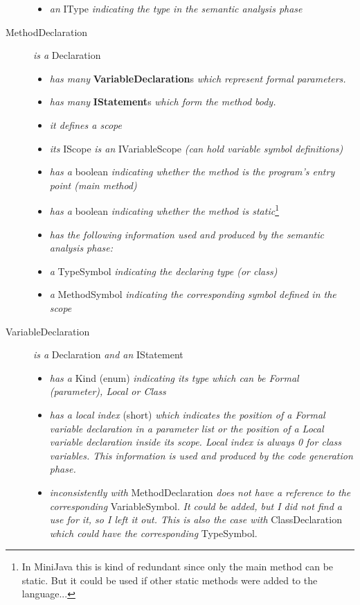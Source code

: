 \documentclass[a4paper,11pt]{article}
\begin{document}
\begin{description}
\begin{itemize}
        \item \emph{an} IType \emph{indicating the type in the semantic analysis phase}
      \end{itemize}
    \item[MethodDeclaration] \emph{is a} Declaration
      \begin{itemize}
        \item \emph{has many} \textbf{VariableDeclaration}s \emph{which represent formal parameters.}
        \item \emph{has many} \textbf{IStatement}s \emph{which form the method body.}
        \item \emph{it defines a scope}
        \item \emph{its} IScope \emph{is an} IVariableScope \emph{(can hold variable symbol definitions)}
        \item \emph{has a} boolean \emph{indicating whether the method is the program's entry point (main method)}
        \item \emph{has a} boolean \emph{indicating whether the method is static}\footnote{In MiniJava this is kind of redundant since only the main method can be static. But it could be used if other static methods were added to the language...}
        \item \emph{has the following information used and produced by the semantic analysis phase:}
        \item \emph{a} TypeSymbol \emph{indicating the declaring type (or class)}
        \item \emph{a} MethodSymbol \emph{indicating the corresponding symbol defined in the scope}
      \end{itemize}
    \item[VariableDeclaration] \emph{is a} Declaration \emph{and an} IStatement
      \begin{itemize}
        \item \emph{has a} Kind (enum) \emph{indicating its type which can be Formal (parameter), Local or Class}
        \item \emph{has a local index} (short) \emph{which indicates the position of a Formal variable declaration in a parameter list or the position of a Local variable declaration inside its scope. Local index is always 0 for class variables. This information is used and produced by the code generation phase.}
        \item \emph{inconsistently with} MethodDeclaration \emph{does not have a reference to the corresponding} VariableSymbol. \emph{It could be added, but I did not find a use for it, so I left it out. This is also the case with} ClassDeclaration \emph{which could have the corresponding} TypeSymbol.

\end{itemize}
\end{description}
\end{document}
